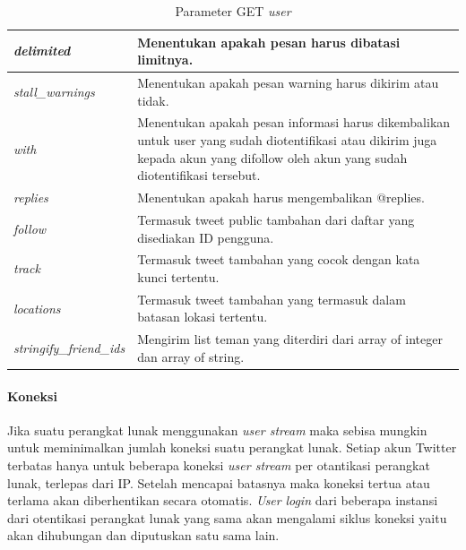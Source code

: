 \begin{table}[h]
\begin{tabular}{|p{5cm}|p{9cm}|}
\hline
\textit{delimited}              & Menentukan apakah pesan harus dibatasi limitnya.																												\\ \hline
\textit{stall\_warnings}        & Menentukan apakah pesan warning harus dikirim atau tidak.                                                               \\ \hline
\textit{with}                   & Menentukan apakah pesan informasi harus dikembalikan untuk user yang sudah diotentifikasi atau dikirim juga kepada akun yang difollow oleh akun yang sudah diotentifikasi tersebut.\\ \hline
\textit{replies}                & Menentukan apakah harus mengembalikan @replies.                                                                             \\ \hline
\textit{follow}                 & Termasuk tweet public tambahan dari daftar yang disediakan ID pengguna.														\\ \hline
\textit{track}                  & Termasuk tweet tambahan yang cocok dengan kata kunci tertentu.     \\ \hline
\textit{locations}              & Termasuk tweet tambahan yang termasuk dalam batasan lokasi tertentu.                                                      \\ \hline
\textit{stringify\_friend\_ids} & Mengirim list teman yang diterdiri dari array of integer dan array of string.              \\ \hline            
\end{tabular}
\caption{Parameter GET \textit{user}}
\label{table:ParameterGetUser}
\end{table}

\paragraph{Koneksi}
Jika suatu perangkat lunak menggunakan \textit{user stream} maka sebisa mungkin untuk meminimalkan jumlah koneksi suatu perangkat lunak. Setiap akun Twitter terbatas hanya untuk beberapa koneksi \textit{user stream} per otantikasi perangkat lunak, terlepas dari IP. Setelah mencapai batasnya maka koneksi tertua atau terlama akan diberhentikan secara otomatis. \textit{User} \textit{login} dari beberapa instansi dari otentikasi perangkat lunak yang sama akan mengalami siklus koneksi yaitu akan dihubungan dan diputuskan satu sama lain.

